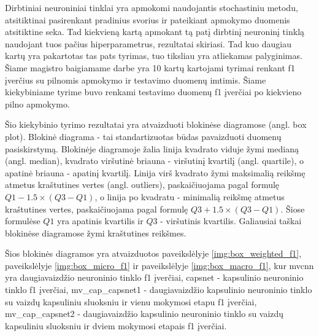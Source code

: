 Dirbtiniai neuroniniai tinklai yra apmokomi naudojantis stochastiniu metodu, atsitiktinai pasirenkant pradinius svorius ir pateikiant apmokymo duomenis atsitiktine seka. Tad kiekvieną kartą apmokant tą patį dirbtinį neuroninį tinklą naudojant tuos pačius hiperparametrus, rezultatai skiriasi. Tad kuo daugiau kartų yra pakartotas tas pats tyrimas, tuo tiksliau yra atliekamas palyginimas. Šiame magistro baigiamame darbe yra 10 kartų kartojami tyrimai renkant f1 įverčius su pilnomis apmokymo ir testavimo duomenų imtimis. Šiame kiekybiniame tyrime buvo renkami testavimo duomenų f1 įverčiai po kiekvieno pilno apmokymo.


Šio kiekybinio tyrimo rezultatai yra atvaizduoti blokinėse diagramose (angl. box plot). Blokinė diagrama - tai standartizuotas būdas pavaizduoti duomenų pasiskirstymą. Blokinėje diagramoje žalia linija kvadrato viduje žymi medianą (angl. median), kvadrato viršutinė briauna - viršutinį kvartilį (angl. quartile), o apatinė briauna - apatinį kvartilį. Linija virš kvadrato žymi maksimalią reikšmę atmetus kraštutines vertes (angl. outliers), paskaičiuojama pagal formulę $Q1 - 1.5 \times (Q3 - Q1)$, o linija po kvadratu - minimalią reikšmę atmetus kraštutines vertes, paskaičiuojama pagal formulę $Q3 + 1.5 \times (Q3 - Q1)$. Šiose formulėse $Q1$ yra apatinis kvartilis ir $Q3$ - viršutinis kvartilis. Galiausiai taškai blokinėse diagramose žymi kraštutines reikšmes.

Šios blokinės diagramos yra atvaizduotos paveikslėlyje \ref{img:box_weighted_f1}, paveikslėlyje \ref{img:box_micro_f1} ir  paveikslėlyje \ref{img:box_macro_f1}, kur
mvcnn yra daugiavaizdžio neuroninio tinklo f1 įverčiai, capsnet - kapsulinio neuroninio tinklo f1 įverčiai, mv\_cap\_capsnet1 - daugiavaizdžio kapsulinio neuroninio tinklo su vaizdų kapsuliniu sluoksniu ir vienu mokymosi etapu f1 įverčiai, mv\_cap\_capsnet2 - daugiavaizdžio kapsulinio neuroninio tinklo su vaizdų kapsuliniu sluoksniu ir dviem mokymosi etapais f1 įverčiai.

